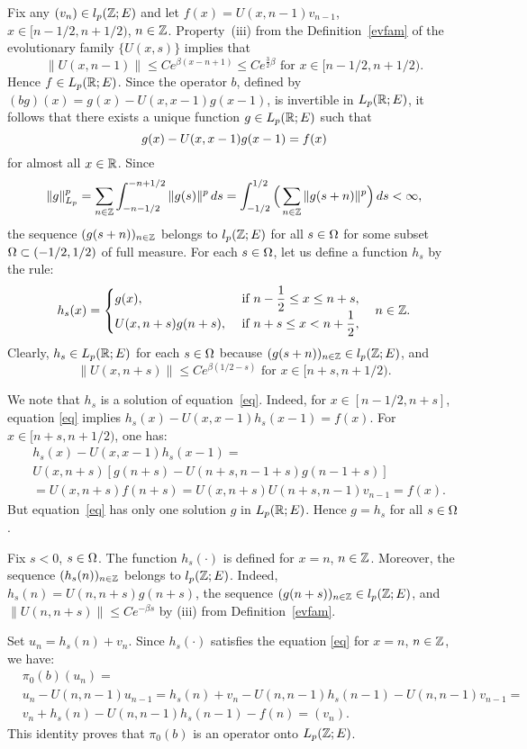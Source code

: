 \begin{pf}
Fix any $(v_n )\in l_p
({\Bbb{Z}};E)$ and let $f(x) =U(x,n-1)v_{n-1}$, $x\in [n-1/2, n+1/2)$,
$n\in{\Bbb{Z}}$.
Property~(iii) from the Definition~\ref{evfam} of
the evolutionary family
$\{U(x,s)\}$ implies that
$$\|U(x,n-1)\| \leq C e^{\beta
(x-n+1)} \leq Ce^{\frac{3}{2}\beta} \mbox{ for } x\in [n-1/2, n+1/2).$$
Hence
$f\in L_p({\Bbb{R}};E)$.
Since the operator
$b$, defined by $(bg)(x) =g(x) -U(x,x-1)g(x-1)$,
is invertible in $L_p ({\Bbb{R}};E)$, it follows that there exists a unique
function $g\in L_p({\Bbb{R}};E)$ such that
\begin{equation}
g(x) -U(x,x-1) g(x-1)=f(x)
\lb{eq}
\end{equation}
for almost all $x\in{\Bbb{R}}$.  Since
$$
\|g\|_{L_p}^p =\sum_{n\in{\Bbb{Z}}} \int_{-n-1/2}^{-n+1/2} \|g(s)\|^p \, ds
=\int_{-1/2}^{1/2} \Big( \sum_{n\in{\Bbb{Z}}} \|g(s+n)\|^p\Big) \, ds <
\infty,
$$
the sequence $(g(s+n))_{n\in{\Bbb{Z}}}$ belongs to $l_p({\Bbb{Z}};E)$ for all
$s\in\Omega$ for some subset $\Omega \subset (-1/2, 1/2)$ of full measure.
For each $s\in\Omega$, let us define a function $h_s$ by the rule:
$$
h_s(x) =\begin{cases}
g(x), & \mbox{ if } n-\dfrac12 \leq x \leq n+s,\\
U(x,n+s) g(n+s), & \mbox{ if } n+s\leq x < n+\dfrac12,
\end{cases}
\quad n \in{\Bbb{Z}}.
$$
Clearly, $h_s \in L_p ({\Bbb{R}};E)$ for each $s\in\Omega$ because
$(g(s+n))_{n\in{\Bbb{Z}}}\in l_p ({\Bbb{Z}};E)$, and
$$\|U(x,n+s)\|
\leq Ce^{\beta (1/2 -s)}
\mbox{ for } x\in [n+s, n+1/2).$$

We note that $h_s$ is a solution of
equation~\eqref{eq}.  Indeed, for $x\in [n-1/2, n+s]$, equation \eqref{eq}
implies $h_s (x) -U(x,x-1)h_s(x-1) =f(x)$.  For $x\in [n+s, n+1/2)$, one has:
 \begin{align*}
& h_s(x) -U(x,x-1) h_s(x-1)  = \\
 & U(x,n+s) [g(n+s) -U(n+s, n-1+s)g(n-1+s)]\\
& = U(x,n+s) f(n+s) =U(x,n+s) U(n+s, n-1) v_{n-1}=f(x).
\end{align*}
But equation~\eqref{eq} has only one solution $g$ in $L_p ({\Bbb{R}};E)$.
Hence $g=h_s$ for all $s\in\Omega$.

Fix $s<0$, $s\in\Omega$.  The function
$h_s(\cdot)$ is defined for $x=n$, $n\in{\Bbb{Z}}$.  Moreover, the sequence
$(h_s(n))_{n\in{\Bbb{Z}}}$ belongs to $l_p ({\Bbb{Z}};E)$. Indeed, $h_s(n)
=U(n,n+s)g(n+s)$, the sequence $(g(n+s))_{n\in{\Bbb{Z}}} \in l_p ({\Bbb{Z}};E)$,
and $\|U(n,n+s)\|\leq Ce^{-\beta s}$ by (iii) from Definition~\ref{evfam}.

Set $u_n =h_s (n) +v_n$.  Since $h_s(\cdot)$
satisfies the equation \eqref{eq} for $x=n$, $n\in {\Bbb{Z}}$, we have:
\begin{align*}
& \pi_0(b) (u_n)  = \\
& u_n -U(n,n-1) u_{n-1} =h_s (n) +v_n -U(n,n-1)
h_s(n-1)-U(n,n-1)v_{n-1} =\\
& v_n+ h_s(n) - U(n, n-1)h_s(n-1) - f(n)= (v_n).
\end{align*}
This identity proves that $\pi_0 (b)$ is an operator onto
$L_p({\Bbb{Z}};E)$.
\end{pf}


